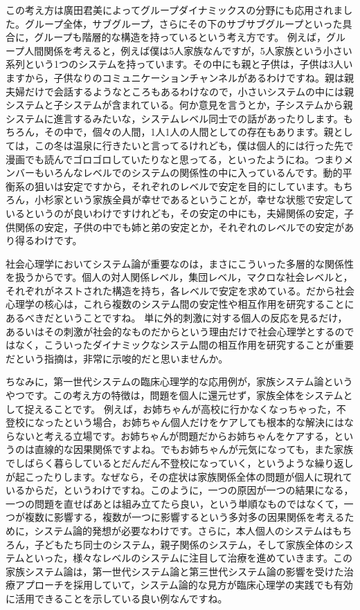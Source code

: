 \documentclass{ltjsbook}
\begin{document}
この考え方は廣田君美によってグループダイナミックスの分野にも応用されました\parencite{HirotaKimiyoshi}。グループ全体，サブグループ，さらにその下のサブサブグループといった具合に，グループも階層的な構造を持っているという考え方です。
例えば，グループ人間関係を考えると，例えば僕は5人家族なんですが，5人家族という小さい系列という1つのシステムを持っています。その中にも親と子供は，子供は3人いますから，子供なりのコミュニケーションチャンネルがあるわけですね。親は親夫婦だけで会話するようなところもあるわけなので，小さいシステムの中には親システムと子システムが含まれている。何か意見を言うとか，子システムから親システムに進言するみたいな，システムレベル同士での話があったりします。もちろん，その中で，個々の人間，1人1人の人間としての存在もあります。親としては，この冬は温泉に行きたいと言ってるけれども，僕は個人的には行った先で漫画でも読んでゴロゴロしていたりなと思ってる，といったようにね。つまりメンバーもいろんなレベルでのシステムの関係性の中に入っているんです。動的平衡系の狙いは安定ですから，それぞれのレベルで安定を目的にしています。もちろん，小杉家という家族全員が幸せであるということが，幸せな状態で安定しているというのが良いわけですけれども，その安定の中にも，夫婦関係の安定，子供関係の安定，子供の中でも姉と弟の安定とか，それぞれのレベルでの安定があり得るわけです。

社会心理学においてシステム論が重要なのは，まさにこういった多層的な関係性を扱うからです。個人の対人関係レベル，集団レベル，マクロな社会レベルと，それぞれがネストされた構造を持ち，各レベルで安定を求めている。だから社会心理学の核心は，これら複数のシステム間の安定性や相互作用を研究することにあるべきだということですね。
単に外的刺激に対する個人の反応を見るだけ，あるいはその刺激が社会的なものだからという理由だけで社会心理学とするのではなく，こういったダイナミックなシステム間の相互作用を研究することが重要だという指摘は，非常に示唆的だと思いませんか。

ちなみに，第一世代システムの臨床心理学的な応用例が，家族システム論というやつです。この考え方の特徴は，問題を個人に還元せず，家族全体をシステムとして捉えることです。
例えば，お姉ちゃんが高校に行かなくなっちゃった，不登校になったという場合，お姉ちゃん個人だけをケアしても根本的な解決にはならないと考える立場です。お姉ちゃんが問題だからお姉ちゃんをケアする，というのは直線的な因果関係ですよね。でもお姉ちゃんが元気になっても，また家族でしばらく暮らしているとだんだん不登校になっていく，というような繰り返しが起こったりします。なぜなら，その症状は家族関係全体の問題が個人に現れているからだ，というわけですね。このように，一つの原因が一つの結果になる，一つの問題を直せばあとは組み立てたら良い，という単順なものではなくて，一つが複数に影響する，複数が一つに影響するという多対多の因果関係を考えるために，システム論的発想が必要なわけです。さらに，本人個人のシステムはもちろん，子どもたち同士のシステム，親子関係のシステム，そして家族全体のシステムといった，様々なレベルのシステムに注目して治療を進めていきます。この家族システム論は，第一世代システム論と第三世代システム論の影響を受けた治療アプローチを採用していて，システム論的な見方が臨床心理学の実践でも有効に活用できることを示している良い例なんですね。
\end{document}
